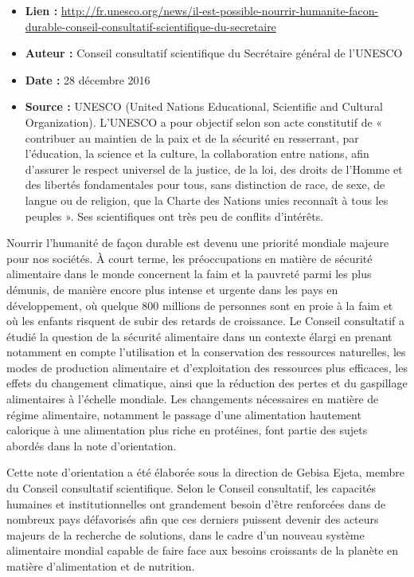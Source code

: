 \documentclass[8pt]{article}
\begin{document}
\begin{itemize}
	\item \textbf{Lien : }  \url{http://fr.unesco.org/news/il-est-possible-nourrir-humanite-facon-durable-conseil-consultatif-scientifique-du-secretaire} 
	\item \textbf{Auteur : } Conseil consultatif scientifique du Secrétaire général de l'UNESCO
	\item \textbf{Date : } 28 décembre 2016
	\item \textbf{Source : } UNESCO (United Nations Educational, Scientific and Cultural Organization). L'UNESCO a pour objectif selon son acte constitutif de « contribuer au maintien de la paix et de la sécurité en resserrant, par l’éducation, la science et la culture, la collaboration entre nations, afin d’assurer le respect universel de la justice, de la loi, des droits de l’Homme et des libertés fondamentales pour tous, sans distinction de race, de sexe, de langue ou de religion, que la Charte des Nations unies reconnaît à tous les peuples ». Ses scientifiques ont très peu de conflits d'intérêts.
\end{itemize}
	
	Nourrir l’humanité de façon durable est devenu une priorité mondiale majeure pour nos sociétés. À court terme, les préoccupations en matière de sécurité alimentaire dans le monde concernent la faim et la pauvreté parmi les plus démunis, de manière encore plus intense et urgente dans les pays en développement, où quelque 800 millions de personnes sont en proie à la faim et où les enfants risquent de subir des retards de croissance. Le Conseil consultatif a étudié la question de la sécurité alimentaire dans un contexte élargi en prenant notamment en compte l’utilisation et la conservation des ressources naturelles, les modes de production alimentaire et d’exploitation des ressources plus efficaces, les effets du changement climatique, ainsi que la réduction des pertes et du gaspillage alimentaires à l’échelle mondiale. Les changements nécessaires en matière de régime alimentaire, notamment le passage d’une alimentation hautement calorique à une alimentation plus riche en protéines, font partie des sujets abordés dans la note d’orientation.

Cette note d’orientation a été élaborée sous la direction de Gebisa Ejeta, membre du Conseil consultatif scientifique. Selon le Conseil consultatif, les capacités humaines et institutionnelles ont grandement besoin d’être renforcées dans de nombreux pays défavorisés afin que ces derniers puissent devenir des acteurs majeurs de la recherche de solutions, dans le cadre d’un nouveau système alimentaire mondial capable de faire face aux besoins croissants de la planète en matière d’alimentation et de nutrition.
\end{document}

